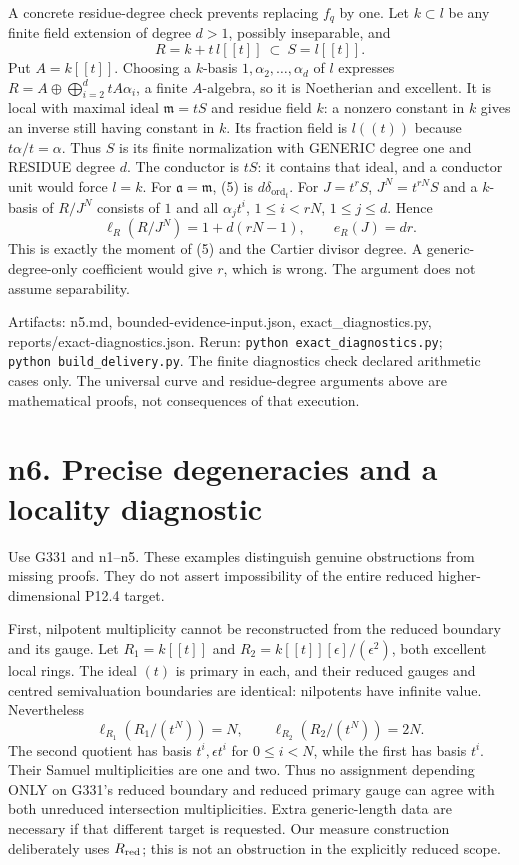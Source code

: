 \documentclass[
  11pt,
]{article}
\begin{document}
A concrete residue-degree check prevents replacing \(f_q\) by one. Let
\(k\subset l\) be any finite field extension of degree \(d>1\), possibly
inseparable, and \[R=k+t\,l[[t]]\ \subset\ S=l[[t]].\] Put \(A=k[[t]]\).
Choosing a \(k\)-basis \(1,\alpha_2,\ldots,\alpha_d\) of \(l\) expresses
\(R=A\oplus\bigoplus_{i=2}^d tA\alpha_i\), a finite \(A\)-algebra, so it
is Noetherian and excellent. It is local with maximal ideal
\(\mathfrak m=tS\) and residue field \(k\): a nonzero constant in \(k\)
gives an inverse still having constant in \(k\). Its fraction field is
\(l((t))\) because \(t\alpha/t=\alpha\). Thus \(S\) is its finite
normalization with GENERIC degree one and RESIDUE degree \(d\). The
conductor is \(tS\): it contains that ideal, and a conductor unit would
force \(l=k\). For \(\mathfrak a=\mathfrak m\), (5) is
\(d\delta_{\operatorname{ord}_t}\). For \(J=t^rS\), \(J^N=t^{rN}S\) and
a \(k\)-basis of \(R/J^N\) consists of \(1\) and all \(\alpha_j t^i\),
\(1\le i<rN\), \(1\le j\le d\). Hence
\[\ell_R(R/J^N)=1+d(rN-1),\qquad e_R(J)=dr.\] This is exactly the moment
of (5) and the Cartier divisor degree. A generic-degree-only coefficient
would give \(r\), which is wrong. The argument does not assume
separability.

Artifacts: n5.md, bounded-evidence-input.json, exact\_diagnostics.py,
reports/exact-diagnostics.json. Rerun:
\texttt{python\ exact\_diagnostics.py};
\texttt{python\ build\_delivery.py}. The finite diagnostics check
declared arithmetic cases only. The universal curve and residue-degree
arguments above are mathematical proofs, not consequences of that
execution.

\section{n6. Precise degeneracies and a locality
diagnostic}\label{n6.-precise-degeneracies-and-a-locality-diagnostic}

Use G331 and n1--n5. These examples distinguish genuine obstructions
from missing proofs. They do not assert impossibility of the entire
reduced higher-dimensional P12.4 target.

First, nilpotent multiplicity cannot be reconstructed from the reduced
boundary and its gauge. Let \(R_1=k[[t]]\) and
\(R_2=k[[t]][\epsilon]/(\epsilon^2)\), both excellent local rings. The
ideal \((t)\) is primary in each, and their reduced gauges and centred
semivaluation boundaries are identical: nilpotents have infinite value.
Nevertheless
\[\ell_{R_1}(R_1/(t^N))=N,\qquad \ell_{R_2}(R_2/(t^N))=2N.\] The second
quotient has basis \(t^i,\epsilon t^i\) for \(0\le i<N\), while the
first has basis \(t^i\). Their Samuel multiplicities are one and two.
Thus no assignment depending ONLY on G331's reduced boundary and reduced
primary gauge can agree with both unreduced intersection multiplicities.
Extra generic-length data are necessary if that different target is
requested. Our measure construction deliberately uses \(R_{\rm red}\);
this is not an obstruction in the explicitly reduced scope.
\end{document}
